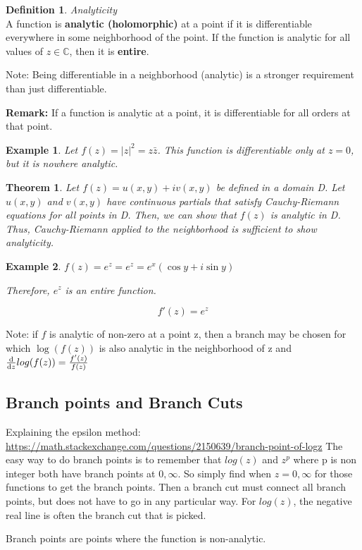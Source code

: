 \documentclass{article}
\newtheorem{theorem}{Theorem}[section]
\newtheorem{ex}{Example}
\theoremstyle{definition}
\newtheorem{definition}{Definition}[section]
\newcommand{\Def}[2]{
\begin{shaded*}
\begin{definition}{\textit{#1}}\\#2\end{definition}
\end{shaded*}
}
\def\C{\mathbb{C}}
\begin{document}
\Def{Analyticity}{A function is \textbf{analytic (holomorphic) }at a point if it is differentiable everywhere in some neighborhood of the point. If the function is analytic for all values of $z \in \C$, then it is \textbf{entire}. 
	
Note: Being differentiable in a neighborhood (analytic) is a stronger requirement than just differentiable. 

\textbf{Remark:} If a function is analytic at a point, it is differentiable for all orders at that point.
}


\begin{ex} Let 
$f(z) = |z|^2 = z \bar{z}$. This function is differentiable only at $z=0$, but it is nowhere analytic. 
\end{ex}

\begin{theorem}Let $f(z) = u(x,y)+iv(x,y)$  be defined in a domain D. Let $u(x,y)$ and $v(x,y)$ have continuous partials that satisfy Cauchy-Riemann equations for all points in D. Then, we can show that $f(z)$ is analytic in D. Thus, Cauchy-Riemann applied to the neighborhood is sufficient to show analyticity.
\end{theorem}

\begin{ex}
$f(z)=e^z = e^z=e^x(\cos y + i \sin y)$


Therefore, $e^z$ is an entire function. 

$$f'(z) = e^z$$
\end{ex}

Note: if $f$ is analytic of non-zero at a point z, then a branch may be chosen for which $\log (f(z))$ is also analytic in the neighborhood of z and $\dv{}{z} log(f(z)) = \frac{f'(z)}{f(z)}$


\subsection{Branch points and Branch Cuts}
Explaining the epsilon method: \url{https://math.stackexchange.com/questions/2150639/branch-point-of-logz}
The easy way to do branch points is to remember that $log(z)$ and $z^p$ where p is non integer both have branch points at $0, \infty$. So simply find when $z = 0, \infty$ for those functions to get the branch points. Then a branch cut must connect all branch points, but does not have to go in any particular way. For $log(z)$, the negative real line is often the branch cut that is picked.


Branch points are points where the function is non-analytic. 
\end{document}
